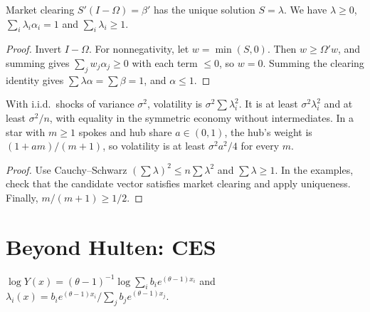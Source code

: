 \begin{theorem}
\label{thm:pn_sales}
\leanok
{}
Market clearing $S'(I-\Omega) = \beta'$ has the unique solution $S = \lambda$. We have $\lambda \ge 0$,
$\sum_i\lambda_i\alpha_i = 1$ and $\sum_i\lambda_i \ge 1$.
\end{theorem}
\begin{proof}
\leanok
Invert $I-\Omega$. For nonnegativity, let $w = \min(S,0)$. Then $w \ge \Omega'w$, and summing gives
$\sum_jw_j\alpha_j \ge 0$ with each term $\le 0$, so $w = 0$. Summing the clearing identity gives
$\sum\lambda\alpha = \sum\beta = 1$, and $\alpha \le 1$.
\end{proof}

\begin{theorem}
\label{thm:pn_volatility}
\leanok
{}
With i.i.d.\ shocks of variance $\sigma^2$, volatility is $\sigma^2\sum\lambda_i^2$. It is at least
$\sigma^2\lambda_i^2$ and at least $\sigma^2/n$, with equality in the symmetric economy without intermediates. In
a star with $m \ge 1$ spokes and hub share $a \in (0,1)$, the hub's weight is $(1+am)/(m+1)$, so volatility is at
least $\sigma^2a^2/4$ for every $m$.
\end{theorem}
\begin{proof}
\leanok
Use Cauchy--Schwarz $(\sum\lambda)^2 \le n\sum\lambda^2$ and $\sum\lambda \ge 1$. In the examples, check that the
candidate vector satisfies market clearing and apply uniqueness. Finally, $m/(m+1) \ge 1/2$.
\end{proof}

\section{Beyond Hulten: CES}

\begin{definition}
\label{def:bf_economy}
\leanok
$\log Y(x) = (\theta-1)^{-1}\log\sum_ib_ie^{(\theta-1)x_i}$ and $\lambda_i(x) = b_ie^{(\theta-1)x_i}/\sum_jb_je^{(\theta-1)x_j}$.
\end{definition}

